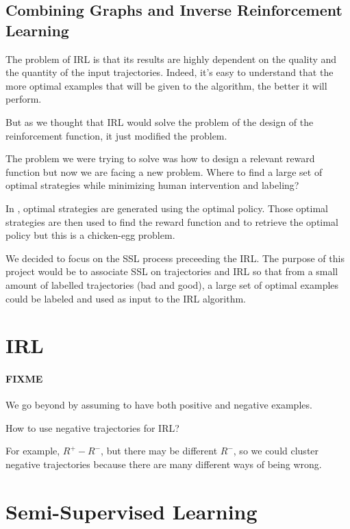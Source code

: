 \documentclass{article}
\begin{document}
\subsection{Combining Graphs and Inverse Reinforcement Learning}

The problem of IRL is that its results are highly dependent on the quality and the quantity of the input trajectories. Indeed, it's easy to understand that the more optimal examples that will be given to the algorithm, the better it will perform.

But as we thought that IRL would solve the problem of the design of the reinforcement function, it just modified the problem.

The problem we were trying to solve was how to design a relevant reward function but now we are facing a new problem. Where to find a large set of optimal strategies while minimizing human intervention and labeling?

In \cite{Ng00}, optimal strategies are generated using the optimal policy. Those optimal strategies are then used to find the reward function and to retrieve the optimal policy but this is a chicken-egg problem.

We decided to focus on the SSL process preceeding the IRL. The purpose of this project would be to associate SSL on trajectories and IRL so that from a small amount of labelled trajectories (bad and good), a large set of optimal examples could be labeled and used as input to the IRL algorithm.


\section{IRL}

\paragraph{FIXME}
We go beyond by assuming to have both positive and negative examples.

How to use negative trajectories for IRL?

For example, $R^+ - R^-$, but there may be different $R^-$, so we could cluster negative trajectories because there are many different ways of being wrong.


\section{Semi-Supervised Learning \label{sec:ssl}}
\end{document}
